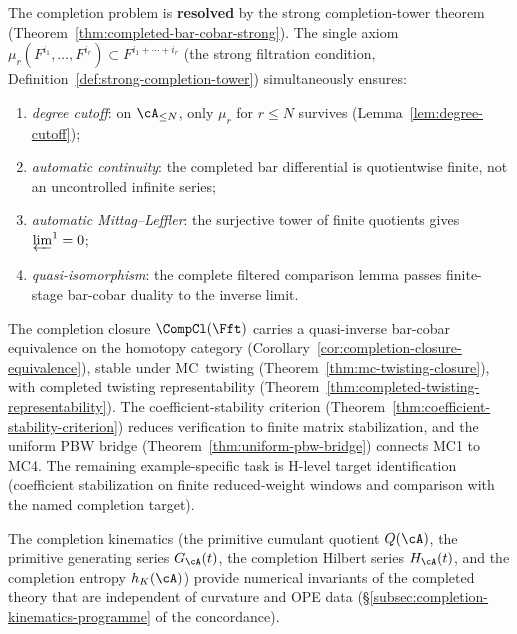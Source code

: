 \begin{remark}
\label{rem:completion-frontier-crystallization}
The completion problem is \textbf{resolved} by the strong
completion-tower theorem
(Theorem~\ref{thm:completed-bar-cobar-strong}). The single axiom
$\mu_r(F^{i_1},\dots,F^{i_r}) \subset F^{i_1+\cdots+i_r}$
(the strong filtration condition,
Definition~\ref{def:strong-completion-tower}) simultaneously ensures:
\begin{enumerate}[label=\textup{(\roman*)}]
\item \emph{degree cutoff}: on $\cA_{\le N}$, only
 $\mu_r$ for $r \le N$ survives
 (Lemma~\ref{lem:degree-cutoff});
\item \emph{automatic continuity}: the completed bar differential is
 quotientwise finite, not an uncontrolled infinite series;
\item \emph{automatic Mittag--Leffler}: the surjective tower of
 finite quotients gives $\varprojlim^1 = 0$;
\item \emph{quasi-isomorphism}: the complete filtered comparison
 lemma passes finite-stage bar-cobar duality to the inverse limit.
\end{enumerate}
The completion closure $\CompCl(\Fft)$ carries a quasi-inverse
bar-cobar equivalence on the homotopy category
(Corollary~\ref{cor:completion-closure-equivalence}), stable under
MC~twisting (Theorem~\ref{thm:mc-twisting-closure}), with completed
twisting representability
(Theorem~\ref{thm:completed-twisting-representability}). The
coefficient-stability criterion
(Theorem~\ref{thm:coefficient-stability-criterion}) reduces
verification to finite matrix stabilization, and the uniform PBW
bridge (Theorem~\ref{thm:uniform-pbw-bridge}) connects MC1 to MC4.
The remaining example-specific task is H-level target identification
(coefficient stabilization on finite reduced-weight windows and
comparison with the named completion target).

The completion kinematics (the primitive cumulant quotient
$Q(\cA)$, the primitive generating series $G_\cA(t)$, the
completion Hilbert series $H_\cA(t)$, and the completion entropy
$h_K(\cA)$) provide numerical invariants of the completed theory
that are independent of curvature and OPE data
(\S\ref{subsec:completion-kinematics-programme} of the concordance).
\end{remark}

